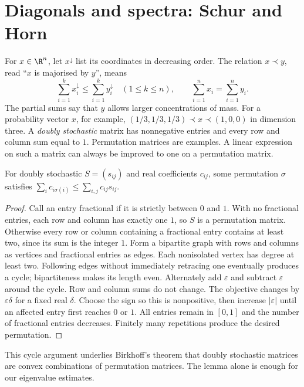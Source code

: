 \section{Diagonals and spectra: Schur and Horn}\label{linear:sec:schurhorn}

For $x\in\R^n$, let $x^\downarrow$ list its coordinates in decreasing order. The relation $x\prec y$, read ``$x$ is majorised by $y$'', means
\[\sum_{i=1}^kx_i^\downarrow\le\sum_{i=1}^ky_i^\downarrow\quad(1\le k\le n),\qquad\sum_{i=1}^nx_i=\sum_{i=1}^ny_i.\]
The partial sums say that $y$ allows larger concentrations of mass. For a probability vector $x$, for example, $(1/3,1/3,1/3)\prec x\prec(1,0,0)$ in dimension three. A \emph{doubly stochastic} matrix has nonnegative entries and every row and column sum equal to $1$. Permutation matrices are examples. A linear expression on such a matrix can always be improved to one on a permutation matrix.

\begin{lemma}\label{linear:lem:birkhoff}
For doubly stochastic $S=(s_{ij})$ and real coefficients $c_{ij}$, some permutation $\sigma$ satisfies $\sum_ic_{i\sigma(i)}\le\sum_{i,j}c_{ij}s_{ij}$.
\end{lemma}
\begin{proof}
Call an entry fractional if it is strictly between $0$ and $1$. With no fractional entries, each row and column has exactly one $1$, so $S$ is a permutation matrix. Otherwise every row or column containing a fractional entry contains at least two, since its sum is the integer $1$. Form a bipartite graph with rows and columns as vertices and fractional entries as edges. Each nonisolated vertex has degree at least two. Following edges without immediately retracing one eventually produces a cycle; bipartiteness makes its length even. Alternately add $\varepsilon$ and subtract $\varepsilon$ around the cycle. Row and column sums do not change. The objective changes by $\varepsilon\delta$ for a fixed real $\delta$. Choose the sign so this is nonpositive, then increase $|\varepsilon|$ until an affected entry first reaches $0$ or $1$. All entries remain in $[0,1]$ and the number of fractional entries decreases. Finitely many repetitions produce the desired permutation.
\end{proof}

This cycle argument underlies Birkhoff's theorem that doubly stochastic matrices are convex combinations of permutation matrices. The lemma alone is enough for our eigenvalue estimates.

